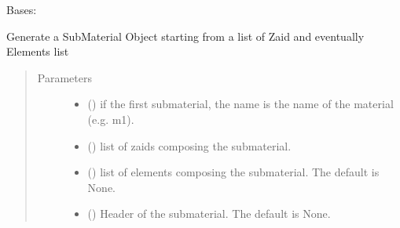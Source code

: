 \documentclass[letterpaper,10pt,english]{sphinxmanual}
\begin{document}
\begin{fulllineitems}
\label{\detokenize{api/inputgeneration:matreader.SubMaterial}}
\sphinxAtStartPar
Bases: 

\sphinxAtStartPar
Generate a SubMaterial Object starting from a list of Zaid and
eventually Elements list
\begin{quote}\begin{description}
\item[{Parameters}] \leavevmode\begin{itemize}
\item {} 
\sphinxAtStartPar
{} () \textendash{} if the first submaterial, the name is the name of the material
(e.g. m1).

\item {} 
\sphinxAtStartPar
{} (\sphinxstyleliteralemphasis{\sphinxupquote{{[}}}{\hyperref[\detokenize{api/inputgeneration:matreader.Zaid}]{\sphinxcrossref{\sphinxstyleliteralemphasis{\sphinxupquote{Zaid}}}}}\sphinxstyleliteralemphasis{\sphinxupquote{{]}}}) \textendash{} list of zaids composing the submaterial.

\item {} 
\sphinxAtStartPar
{} (\sphinxstyleliteralemphasis{\sphinxupquote{{[}}}{\hyperref[\detokenize{api/inputgeneration:matreader.Element}]{\sphinxcrossref{\sphinxstyleliteralemphasis{\sphinxupquote{Element}}}}}\sphinxstyleliteralemphasis{\sphinxupquote{{]}}}\sphinxstyleliteralemphasis{\sphinxupquote{, }}) \textendash{} list of elements composing the submaterial. The default is None.

\item {} 
\sphinxAtStartPar
{} (\sphinxstyleliteralemphasis{\sphinxupquote{, }}) \textendash{} Header of the submaterial. The default is None.


\end{itemize}
\end{description}
\end{quote}
\end{fulllineitems}
\end{document}
